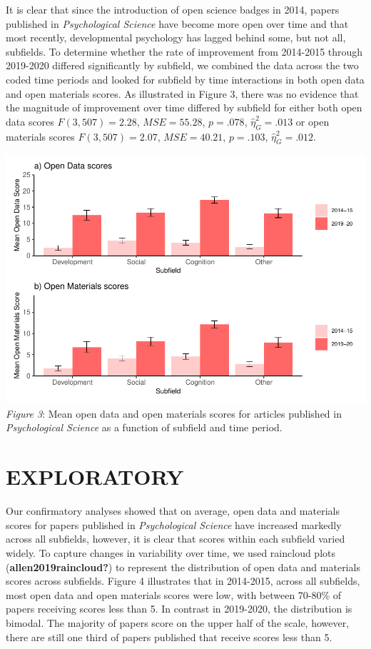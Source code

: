 \documentclass[
  english,
  man,floatsintext]{apa6}
\begin{document}
It is clear that since the introduction of open science badges in 2014, papers published in \emph{Psychological Science} have become more open over time and that most recently, developmental psychology has lagged behind some, but not all, subfields. To determine whether the rate of improvement from 2014-2015 through 2019-2020 differed significantly by subfield, we combined the data across the two coded time periods and looked for subfield by time interactions in both open data and open materials scores. As illustrated in Figure 3, there was no evidence that the magnitude of improvement over time differed by subfield for either both open data scores \(F(3, 507) = 2.28\), \(\mathit{MSE} = 55.28\), \(p = .078\), \(\hat{\eta}^2_G = .013\) or open materials scores \(F(3, 507) = 2.07\), \(\mathit{MSE} = 40.21\), \(p = .103\), \(\hat{\eta}^2_G = .012\).

\includegraphics{icd_special_issue_files/figure-latex/unnamed-chunk-3-1.pdf}
\emph{Figure 3}: Mean open data and open materials scores for articles published in \emph{Psychological Science} as a function of subfield and time period.

\hypertarget{exploratory}{%
\section{EXPLORATORY}\label{exploratory}}

Our confirmatory analyses showed that on average, open data and materials scores for papers published in \emph{Psychological Science} have increased markedly across all subfields, however, it is clear that scores within each subfield varied widely. To capture changes in variability over time, we used raincloud plots (\textbf{allen2019raincloud?}) to represent the distribution of open data and materials scores across subfields. Figure 4 illustrates that in 2014-2015, across all subfields, most open data and open materials scores were low, with between 70-80\% of papers receiving scores less than 5. In contrast in 2019-2020, the distribution is bimodal. The majority of papers score on the upper half of the scale, however, there are still one third of papers published that receive scores less than 5.
\end{document}
